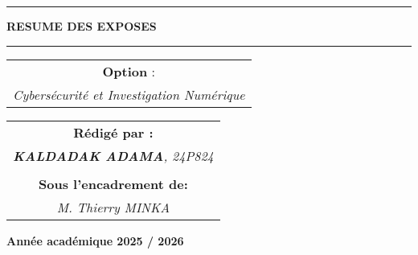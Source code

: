 \documentclass[memoire, 12pt]{report}
\begin{document}
\begin{titlepage}
\begin{center}
		\vspace{0.5cm}
		\begin{tabular}{l*{40}{@{\hskip 3.5cm}c@{\hskip5cm}} p{3.5cm} r}
		\end{tabular}
		
		\noindent\rule{\textwidth}{0.7mm}
		\Large{{\textbf{RESUME DES EXPOSES}}}\\
		\noindent\rule{\textwidth}{0.7mm}
	\end{center}


        \vspace{0.5cm}
	\begin{center}
	\begin{tabular}{c}
		
		\vspace{0.1cm}
		\normalsize
	
	
		\vspace{0.1cm}
		\normalsize\textbf{Option }:\\
		\normalsize				
		\textsl{Cybersécurité et Investigation Numérique}
		
	\end{tabular}
	\end{center}
		
	\begin{center}
		\normalsize %
		\begin{tabular}{c}
			\vspace{0.07cm}
			\hspace{0.02cm} \textbf{\textbf{Rédigé par :}}\\
			\hspace{0.02cm} \textsl{\textbf{KALDADAK ADAMA}, 24P824}\\\\
			\vspace{0.1cm}
			\hspace{0.02cm} \textbf{Sous l'encadrement de:}\\
			\hspace{0.02cm} \textsl{M. Thierry MINKA}\\
				
               
		\end{tabular}
	\end{center}
    
	\vspace{4cm}
	\begin{center}
		\textbf{Année académique 2025 / 2026}
	\end{center}
		
	\vspace{-1.4cm}
	
		
	\vfill%
	
\end{titlepage}
\end{document}
